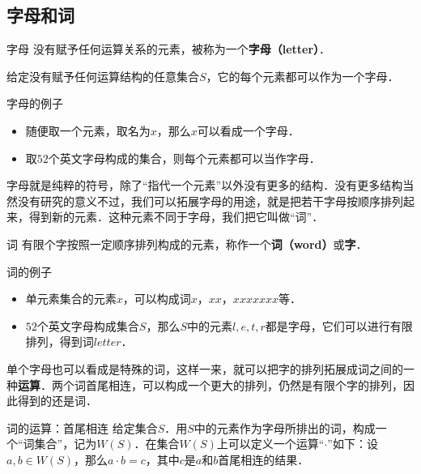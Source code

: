 
\subsection{字母和词}

\begin{definition}{字母}
没有赋予任何运算关系的元素，被称为一个\textbf{字母（letter）}．
\end{definition}

给定没有赋予任何运算结构的任意集合$S$，它的每个元素都可以作为一个字母．

\begin{example}{字母的例子}
\begin{itemize}
\item 随便取一个元素，取名为$x$，那么$x$可以看成一个字母．
\item 取$52$个英文字母构成的集合，则每个元素都可以当作字母．
\end{itemize}
\end{example}

字母就是纯粹的符号，除了“指代一个元素”以外没有更多的结构．没有更多结构当然没有研究的意义不过，我们可以拓展字母的用途，就是把若干字母按顺序排列起来，得到新的元素．这种元素不同于字母，我们把它叫做“词”．

\begin{definition}{词}
有限个字按照一定顺序排列构成的元素，称作一个\textbf{词（word）}或\textbf{字}．
\end{definition}

\begin{example}{词的例子}
\begin{itemize}
\item 单元素集合的元素$x$，可以构成词$x$，$xx$，$xxxxxxx$等．
\item $52$个英文字母构成集合$S$，那么$S$中的元素$l, e, t, r$都是字母，它们可以进行有限排列，得到词$letter$．
\end{itemize}

\end{example}

单个字母也可以看成是特殊的词，这样一来，就可以把字的排列拓展成词之间的一种\textbf{运算}．两个词首尾相连，可以构成一个更大的排列，仍然是有限个字的排列，因此得到的还是词．

\begin{definition}{词的运算：首尾相连}
给定集合$S$．用$S$中的元素作为字母所排出的词，构成一个“词集合”，记为$W(S)$．在集合$W(S)$上可以定义一个运算“$\cdot$”如下：设$a, b\in W(S)$，那么$a\cdot b=c$，其中$c$是$a$和$b$首尾相连的结果．
\end{definition}

